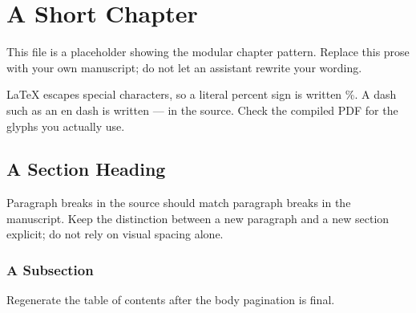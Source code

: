 \chapter{A Short Chapter}

This file is a placeholder showing the modular chapter pattern. Replace this
prose with your own manuscript; do not let an assistant rewrite your wording.

LaTeX escapes special characters, so a literal percent sign is written \%.
A dash such as an en dash is written --- in the source. Check the compiled
PDF for the glyphs you actually use.

\section{A Section Heading}

Paragraph breaks in the source should match paragraph breaks in the
manuscript. Keep the distinction between a new paragraph and a new section
explicit; do not rely on visual spacing alone.

\subsection{A Subsection}

Regenerate the table of contents after the body pagination is final.
